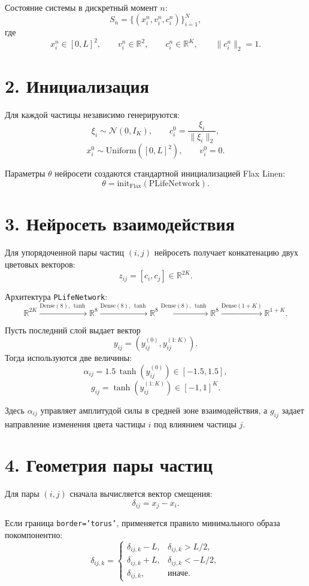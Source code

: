 \documentclass[11pt,a4paper]{article}
\begin{document}
Состояние системы в дискретный момент $n$:
\[
S_n=\{(x_i^n,v_i^n,c_i^n)\}_{i=1}^{N},
\]
где
\[
x_i^n\in[0,L]^2,\qquad v_i^n\in\mathbb{R}^2,\qquad
c_i^n\in\mathbb{R}^K,\qquad \|c_i^n\|_2=1.
\]

\section*{2. Инициализация}

Для каждой частицы независимо генерируются:
\[
\xi_i \sim \mathcal{N}(0,I_K),\qquad
c_i^0=\frac{\xi_i}{\|\xi_i\|_2},
\]
\[
x_i^0 \sim \mathrm{Uniform}([0,L]^2),\qquad
v_i^0=0.
\]

Параметры $\theta$ нейросети создаются стандартной инициализацией Flax Linen:
\[
\theta = \mathrm{init}_{\mathrm{Flax}}(\mathrm{PLifeNetwork}).
\]

\section*{3. Нейросеть взаимодействия}

Для упорядоченной пары частиц $(i,j)$ нейросеть получает конкатенацию двух
цветовых векторов:
\[
z_{ij} = [c_i,c_j]\in\mathbb{R}^{2K}.
\]

Архитектура \texttt{PLifeNetwork}:
\[
\mathbb{R}^{2K}
\xrightarrow{\mathrm{Dense}(8),\,\tanh}
\mathbb{R}^{8}
\xrightarrow{\mathrm{Dense}(8),\,\tanh}
\mathbb{R}^{8}
\xrightarrow{\mathrm{Dense}(8),\,\tanh}
\mathbb{R}^{8}
\xrightarrow{\mathrm{Dense}(1+K)}
\mathbb{R}^{1+K}.
\]

Пусть последний слой выдает вектор
\[
y_{ij}=(y_{ij}^{(0)},y_{ij}^{(1:K)}).
\]
Тогда используются две величины:
\[
\alpha_{ij}=1.5\,\tanh(y_{ij}^{(0)})\in[-1.5,1.5],
\]
\[
g_{ij}=\tanh(y_{ij}^{(1:K)})\in[-1,1]^K.
\]

Здесь $\alpha_{ij}$ управляет амплитудой силы в средней зоне взаимодействия, а
$g_{ij}$ задает направление изменения цвета частицы $i$ под влиянием частицы $j$.

\section*{4. Геометрия пары частиц}

Для пары $(i,j)$ сначала вычисляется вектор смещения:
\[
\delta_{ij}=x_j-x_i.
\]

Если граница \texttt{border='torus'}, применяется правило минимального образа
покомпонентно:
\[
\delta_{ij,k}=
\begin{cases}
\delta_{ij,k}-L, & \delta_{ij,k}>L/2,\\
\delta_{ij,k}+L, & \delta_{ij,k}<-L/2,\\
\delta_{ij,k}, & \text{иначе}.
\end{cases}
\]
\end{document}

